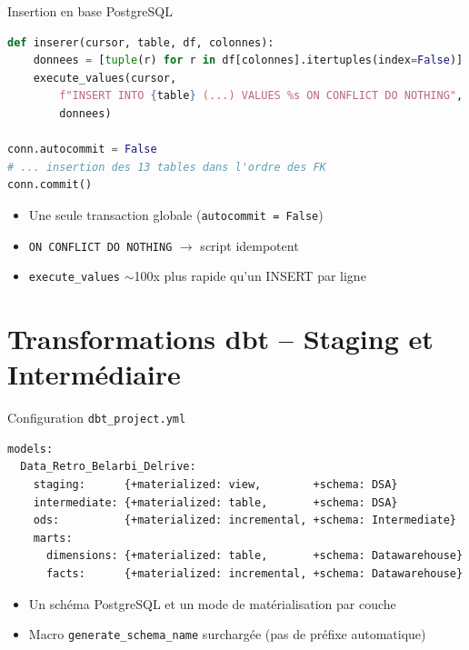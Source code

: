 \documentclass[12pt,aspectratio=169]{beamer}
\begin{document}
\begin{frame}[fragile]{Insertion en base PostgreSQL}
  \begin{lstlisting}[language=Python]
def inserer(cursor, table, df, colonnes):
    donnees = [tuple(r) for r in df[colonnes].itertuples(index=False)]
    execute_values(cursor,
        f"INSERT INTO {table} (...) VALUES %s ON CONFLICT DO NOTHING",
        donnees)

conn.autocommit = False
# ... insertion des 13 tables dans l'ordre des FK
conn.commit()
  \end{lstlisting}
  \begin{itemize}
    \item<+-> Une seule \alert{transaction globale} (\texttt{autocommit = False})
    \item<+-> \texttt{ON CONFLICT DO NOTHING} $\to$ script \alert{idempotent}
    \item<+-> \texttt{execute\_values} $\sim$100x plus rapide qu'un INSERT par ligne
  \end{itemize}
\end{frame}

\section{Transformations dbt -- Staging et Intermédiaire}

\begin{frame}[fragile]{Configuration \texttt{dbt\_project.yml}}
  \begin{lstlisting}[language=Jinja]
models:
  Data_Retro_Belarbi_Delrive:
    staging:      {+materialized: view,        +schema: DSA}
    intermediate: {+materialized: table,       +schema: DSA}
    ods:          {+materialized: incremental, +schema: Intermediate}
    marts:
      dimensions: {+materialized: table,       +schema: Datawarehouse}
      facts:      {+materialized: incremental, +schema: Datawarehouse}
  \end{lstlisting}
  \begin{itemize}
    \item<+-> Un schéma PostgreSQL et un mode de matérialisation par couche
    \item<+-> Macro \texttt{generate\_schema\_name} surchargée (pas de préfixe
          automatique)
  \end{itemize}
\end{frame}
\end{document}
